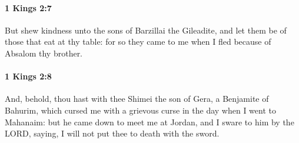 		\paragraph{1 Kings 2:7} %
			\label{1KINGS-2-7}

			But shew kindness unto the sons of Barzillai the Gileadite, and let them be of those that eat at thy table: for so they came to me when I fled because of Absalom thy brother.


		\paragraph{1 Kings 2:8} %
			\label{1KINGS-2-8}

			And, behold, thou hast with thee Shimei the son of Gera, a Benjamite of Bahurim, which cursed me with a grievous curse in the day when I went to Mahanaim: but he came down to meet me at Jordan, and I sware to him by the LORD, saying, I will not put thee to death with the sword.

